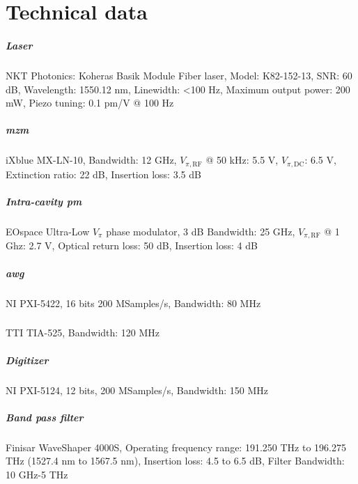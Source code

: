 \chapter{Technical data}

\label{app-data}

\paragraph{Laser} NKT Photonics: Koheras Basik Module Fiber laser, Model: K82-152-13, SNR: 60 dB, Wavelength: 1550.12 nm, Linewidth: <100 Hz, Maximum output power: 200 mW, Piezo tuning: 0.1 pm/V @ 100 Hz \cite{laser}

\paragraph{\acrlong{mzm}} iXblue MX-LN-10,
Bandwidth: 12 GHz, $V_{\pi,\text{RF}}$ @ 50 kHz: 5.5 V, $V_{\pi,\text{DC}}$: 6.5 V, Extinction ratio: 22 dB, Insertion loss: 3.5 dB \cite{mzm}

\paragraph{Intra-cavity \acrlong{pm}} EOspace Ultra-Low $V_\pi$ phase modulator, 3 dB Bandwidth: 25 GHz, $V_{\pi,\text{RF}}$ @ 1 Ghz: 2.7 V, Optical return loss: 50 dB, Insertion loss: 4 dB \cite{AkroutAkram2016Pprc}

\paragraph{\acrlong{awg}} NI PXI-5422, 16 bits 200 MSamples/s, Bandwidth: 80 MHz \cite{ni-pxi}

\paragraph{} TTI TIA-525, Bandwidth: 120 MHz \cite{pd}

\paragraph{Digitizer} NI PXI-5124, 12 bits, 200 MSamples/s, Bandwidth: 150 MHz \cite{ni-digitizer}

\paragraph{Band pass filter} Finisar WaveShaper 4000S, Operating frequency range: 191.250 THz to 196.275 THz (1527.4 nm to 1567.5 nm), Insertion loss: 4.5 to 6.5 dB, Filter Bandwidth: 10 GHz-5 THz \cite{wave-shaper}


